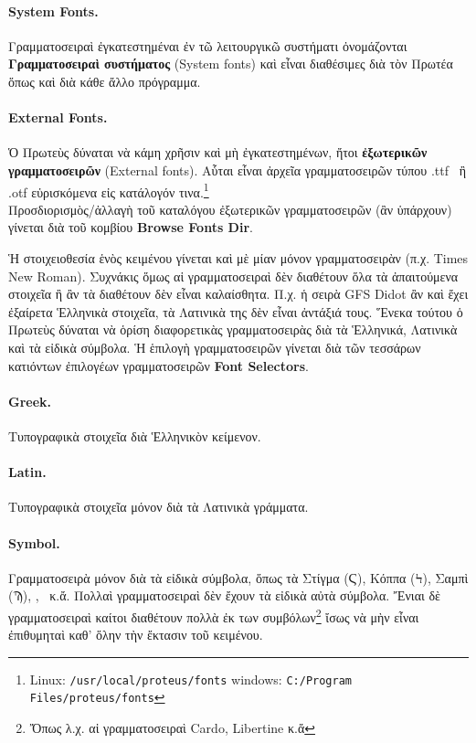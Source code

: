 \documentclass[12pt,a4paper]{article}
\begin{document}
    \paragraph{\bf System Fonts.} Γραμματοσειραὶ ἐγκατεστημέναι ἐν τῶ
      λειτουργικῶ συστήματι ὀνομάζονται {\bf Γραμματοσειραὶ συστήματος}
      (System fonts) καὶ εἶναι διαθέσιμες διὰ τὸν Πρωτέα ὅπως καὶ διὰ
      κάθε ἄλλο πρόγραμμα.
    \paragraph{External Fonts.} Ὁ Πρωτεὺς δύναται νὰ κάμη χρῆσιν καὶ μὴ
      ἐγκατεστημένων, ἤτοι {\bf ἐξωτερικῶν γραμματοσειρῶν} (External fonts).
      Αὗται εἶναι ἀρχεῖα γραμματοσειρῶν τύπου  .ttf~ ἢ .otf
      εὑρισκόμενα εἰς κατάλογόν τινα.\footnote{
              Linux: {\tt /usr/local/proteus/fonts}\newline
              windows: {\tt C:/Program Files/proteus/fonts}
              }\\
      Προσδιορισμὸς/ἀλλαγὴ τοῦ καταλόγου ἐξωτερικῶν γραμματοσειρῶν
      (ἂν ὑπάρχουν) γίνεται διὰ τοῦ κομβίου {\bf Browse Fonts Dir}.

    \vspace{5mm}
    \noindent
    Ἡ στοιχειοθεσία ἑνὸς κειμένου γίνεται καὶ μὲ μίαν μόνον
    γραμματοσειρὰν (π.χ. Times New Roman). Συχνάκις ὅμως
    αἱ γραμματοσειραὶ
    δὲν διαθέτουν ὅλα τὰ ἀπαιτούμενα στοιχεῖα
    ἢ ἂν τὰ διαθέτουν δὲν εἶναι καλαίσθητα. Π.χ. ἡ σειρὰ GFS Didot ἂν
    καὶ ἔχει ἐξαίρετα Ἑλληνικὰ στοιχεῖα, τὰ Λατινικὰ της δὲν εἶναι
    ἀντάξιά τους. Ἕνεκα τούτου ὁ Πρωτεὺς δύναται νὰ ὁρίση
    διαφορετικὰς γραμματοσειρὰς διὰ τὰ Ἑλληνικά, Λατινικὰ
    καὶ τὰ εἰδικὰ σύμβολα.
    Ἡ ἑπιλογὴ γραμματοσειρῶν γίνεται διὰ τῶν τεσσάρων κατιόντων
    ἐπιλογέων γραμματοσειρῶν {\bf Font Selectors}.
    \paragraph{Greek.} Τυπογραφικὰ στοιχεῖα διὰ Ἑλληνικὸν κείμενον.
    \paragraph{Latin.} Τυπογραφικὰ στοιχεῖα μόνον διὰ τὰ Λατινικὰ γράμματα.
    \paragraph{Symbol.}Γραμματοσειρὰ μόνον διὰ τὰ εἰδικὰ σύμβολα, ὅπως
      τὰ Στίγμα (Ϛ), Κόππα (Ϟ), Σαμπὶ (Ϡ), \dag, \ddag\ κ.ἄ.
      Πολλαὶ γραμματοσειραὶ δὲν ἔχουν τὰ εἰδικὰ αὐτὰ σύμβολα.
      Ἔνιαι δὲ γραμματοσειραὶ καίτοι διαθέτουν πολλὰ
      ἐκ των συμβόλων\footnote{Ὄπως λ.χ. αἱ γραμματοσειραὶ Cardo, Libertine
                               κ.ἄ}
      ἴσως νὰ μὴν εἶναι ἐπιθυμηταὶ καθ’ ὅλην τὴν ἔκτασιν τοῦ κειμένου.
\end{document}
